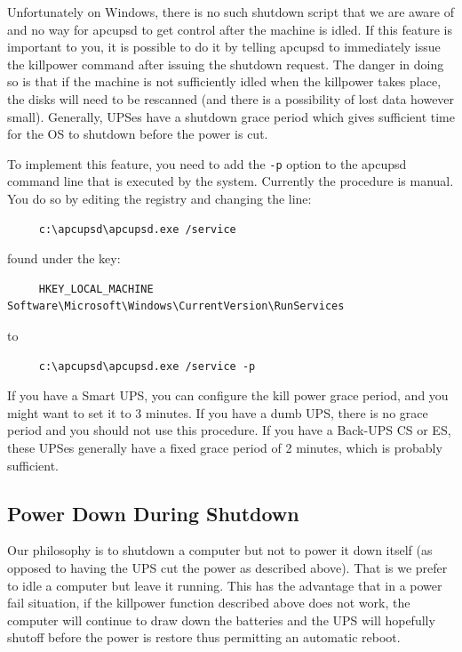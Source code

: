 {{{{{{{Unfortunately on Windows, there is no such shutdown script that we are aware
of and no way for apcupsd to get control after the machine is idled. If this
feature is important to you, it is possible to do it by telling apcupsd to
immediately issue the killpower command after issuing the shutdown request.
The danger in doing so is that if the machine is not sufficiently idled when
the killpower takes place, the disks will need to be rescanned (and there is a
possibility of lost data however small). Generally, UPSes have a shutdown
grace period which gives sufficient time for the OS to shutdown before the
power is cut.  

To implement this feature, you need to add the {\tt -p} option to the apcupsd
command line that is executed by the system.  Currently the procedure is
manual. You do so by editing the registry and changing the line: 

\footnotesize
\begin{verbatim}
     c:\apcupsd\apcupsd.exe /service
\end{verbatim}
\normalsize

found under the key: 

\footnotesize
\begin{verbatim}
     HKEY_LOCAL_MACHINE Software\Microsoft\Windows\CurrentVersion\RunServices
\end{verbatim}
\normalsize

to 

\footnotesize
\begin{verbatim}
     c:\apcupsd\apcupsd.exe /service -p
\end{verbatim}
\normalsize

If you have a Smart UPS, you can configure the kill power grace period, and
you might want to set it to 3 minutes. If you have a dumb UPS, there is no
grace period and you should not use this procedure. If you have a Back-UPS CS
or ES, these UPSes generally have a fixed grace period of 2 minutes, which is
probably sufficient. 

\label{Power-Down-During-Shutdown}

\subsection*{Power Down During Shutdown}

\label{index-Windows_002c-Power-down-184}
\label{index-Power-down_002c-Windows-185}
Our philosophy is to shutdown a computer but not to power it down itself (as
opposed to having the UPS cut the power as described above). That is we prefer
to idle a computer but leave it running. This has the advantage that in a
power fail situation, if the killpower function described above does not work,
the computer will continue to draw down the batteries and the UPS will
hopefully shutoff before the power is restore thus permitting an automatic
reboot.  

}}}}}}}
